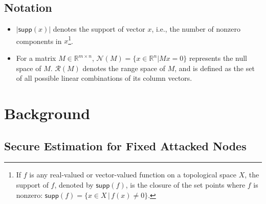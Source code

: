 \documentclass[../../thesis.tex]{subfiles}
\newcommand{\norm}[1]{\left\lVert#1\right\rVert}
\begin{document}
\subsection{Notation}
\begin{itemize}
\item 
$\lvert \textsf{supp} (x) \rvert $  denotes the support of vector $x$, i.e., the number of nonzero components in $x$\footnote{If $f$ is any real-valued or vector-valued function on a topological space $X$, the support of $f$, denoted by $\textsf{supp}(f)$, is the closure of the set points where $f$ is nonzero: $\textsf{supp}(f)  = \{ x \in X \,|\, f(x) \neq 0 \}$.}. 
\item  
For a matrix $M \in \mathbb{R}^{m \times n}$, $\mathcal{N} (M) = \{ x \in \mathbb{R}^n \lvert M x = 0 \}$ represents the null space of $M$. $\mathcal{R}(M)$ denotes the range space of $M$, and is defined as the set of all possible linear combinations of its column vectors.
\end{itemize}


\section{Background}\label{sec:overview} 

\subsection{Secure Estimation for Fixed Attacked Nodes \cite{Fawzi:2014} }
\end{document}
